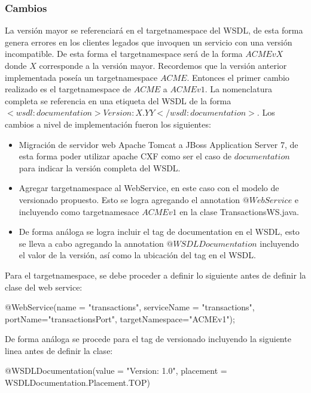 \documentclass[12pt]{article}
\begin{document}
\subsubsection{Cambios}
La versión mayor se referenciará en el targetnamespace del WSDL, de esta forma genera errores en los clientes legados que invoquen un servicio con una versión incompatible. De esta forma el targetnamespace será de la forma $ACMEvX$ donde $X$ corresponde a la versión mayor. Recordemos que la versión anterior implementada poseía un targetnamespace $ACME$. Entonces el primer cambio realizado es el targetnamespace de $ACME$ a $ACMEv1$.
La nomenclatura completa se referencia en una etiqueta del WSDL de la forma $<wsdl:documentation>Version: X.YY</wsdl:documentation>$.
Los cambios a nivel de implementación fueron los siguientes:
\begin{itemize}
  \item Migración de servidor web Apache Tomcat a JBoss Application Server 7, de esta forma poder utilizar apache CXF como ser el caso de $documentation$ para indicar la versión completa del WSDL.
  \item Agregar targetnamespace al WebService, en este caso con el modelo de versionado propuesto. Esto se logra agregando el annotation $@WebService$ e incluyendo como targetnamesace $ACMEv1$ en la clase TransactionsWS.java.
  \item De forma análoga se logra incluir el tag de documentation en el WSDL, esto se lleva a cabo agregando la annotation $@WSDLDocumentation$ incluyendo el valor de la versión, así como la ubicación del tag en el WSDL.
\end{itemize}


Para el targetnamespace, se debe proceder a definir lo siguiente antes de definir la clase del web service:
\begin{center}
    @WebService(name = "transactions", serviceName = "transactions", 
                portName="transactionsPort", targetNamespace="ACMEv1");
\end{center}

De forma análoga se procede para el tag de versionado incluyendo la siguiente linea antes de definir la clase:
\begin{center}
  @WSDLDocumentation(value = "Version: 1.0", placement = WSDLDocumentation.Placement.TOP)
\end{center}

%
%
\end{document}

